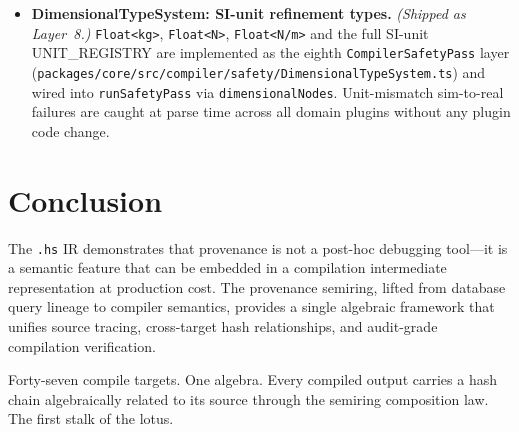 \documentclass[sigconf,nonacm]{acmart}
\newcommand{\hscore}{\texttt{.hs}}
\begin{document}
\begin{itemize}
    \texttt{redischarge} (re-proof required) or emit an honest
    \texttt{error}---resolving the provenance ambiguity between
    ``parameter changed'' and ``correctness boundary crossed.''
  \item \textbf{DimensionalTypeSystem: SI-unit refinement types.} \emph{(Shipped as Layer~8.)}
    \texttt{Float<kg>}, \texttt{Float<N>}, \texttt{Float<N/m>} and the
    full SI-unit UNIT\_REGISTRY are implemented as the eighth
    \texttt{CompilerSafetyPass} layer
    (\texttt{packages/core/src/compiler/safety/DimensionalTypeSystem.ts})
    and wired into \texttt{runSafetyPass} via \texttt{dimensionalNodes}.
    Unit-mismatch sim-to-real failures are caught at parse time across
    all domain plugins without any plugin code change.
\end{itemize}

\section{Conclusion}
\label{sec:conclusion}

The \hscore{} IR demonstrates that provenance is not a post-hoc
debugging tool---it is a semantic feature that can be embedded
in a compilation intermediate representation at production cost.
The provenance semiring, lifted from database query lineage to
compiler semantics, provides a single algebraic framework that
unifies source tracing, cross-target hash relationships, and
audit-grade compilation verification.

Forty-seven compile targets. One algebra. Every compiled output
carries a hash chain algebraically related to its source through
the semiring composition law. The first stalk of the lotus.



\end{document}
